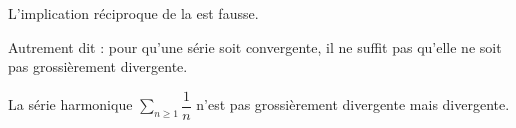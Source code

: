 \begin{rem}
L'implication réciproque de la  est fausse.

Autrement dit : pour qu'une série soit convergente, il ne suffit pas qu'elle ne soit pas grossièrement divergente.
\end{rem}

\begin{dem}
La série harmonique \(\sum_{n\geq1}\dfrac{1}{n}\) n'est pas grossièrement divergente mais divergente.
\end{dem}